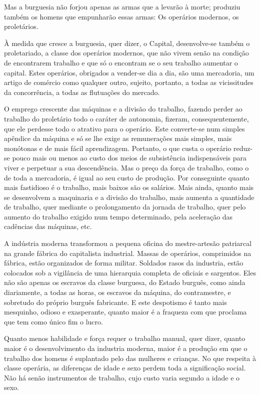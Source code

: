 Mas a burguesia não forjou apenas as armas que a levarão à morte;
produziu também os homens que empunharão essas armas: Os operários
modernos, os proletários.

À medida que cresce a burguesia, quer dizer, o Capital, desenvolve-se
também o proletariado, a classe dos operários modernos, que não vivem
senão na condição de encontrarem trabalho e que só o encontram se o
seu trabalho aumentar o capital. Estes operários, obrigados a
vender-se dia a dia, são uma mercadoria, um artigo de comércio como
qualquer outro, sujeito, portanto, a todas as vicissitudes da
concorrência, a todas as flutuações do mercado.

O emprego crescente das máquinas e a divisão do trabalho, fazendo
perder ao trabalho do proletário todo o caráter de autonomia, fizeram,
consequentemente, que ele perdesse todo o atrativo para o
operário. Este converte-se num simples apêndice da máquina e só se lhe
exige as remunerações mais simples, mais monótonas e de mais fácil
aprendizagem. Portanto, o que custa o operário reduz-se pouco mais ou
menos ao custo dos meios de subsistência indispensáveis para viver e
perpetuar a sua descendência. Mas o preço da força de trabalho, como o
de toda a mercadoria, é igual ao seu custo de produção. Por
conseguinte quanto mais fastidioso é o trabalho, mais baixos são os
salários. Mais ainda, quanto mais se desenvolvem a maquinaria e a
divisão do trabalho, mais aumenta a quantidade de trabalho, quer
mediante o prolongamento da jornada de trabalho, quer pelo aumento do
trabalho exigido num tempo determinado, pela aceleração das cadências
das máquinas, etc.

A indústria moderna transformou a pequena oficina do mestre-artesão
patriarcal na grande fábrica do capitalista industrial. Massas de
operários, comprimidos na fábrica, estão organizados de forma
militar. Soldados rasos da industria, estão colocados sob a vigilância
de uma hierarquia completa de oficiais e sargentos. Eles não são
apenas os escravos da classe burguesa, do Estado burguês, como ainda
diariamente, a todas as horas, os escravos da máquina, do
contramestre, e sobretudo do próprio burguês fabricante. E este
despotismo é tanto mais mesquinho, odioso e exasperante, quanto maior
é a fraqueza com que proclama que tem como único fim o lucro.

Quanto menos habilidade e força requer o trabalho manual, quer dizer,
quanto maior é o desenvolvimento da industria moderna, maior é a
produção em que o trabalho dos homens é suplantado pelo das mulheres e
crianças. No que respeita à classe operária, as diferenças de idade e
sexo perdem toda a significação social. Não há senão instrumentos de
trabalho, cujo custo varia segundo a idade e o sexo.

